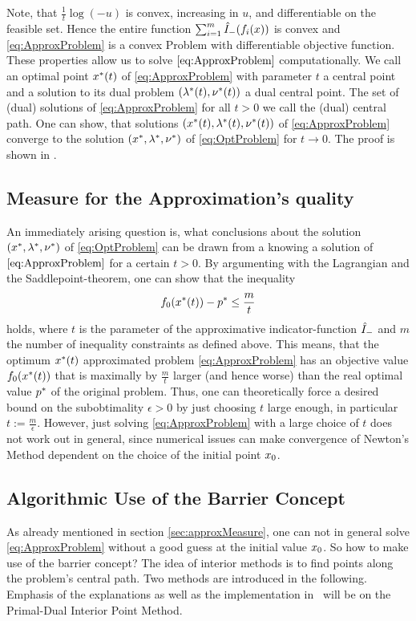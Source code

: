 Note, that $ \frac{1}{t}\log(-u) $ is convex, increasing in $ u $, and differentiable on the feasible set. Hence the entire function $ \sum_{i=1}^{m} {\hat{I}}_{\mathrm{-}}(f_i(x)) $ is convex and \eqref{eq:ApproxProblem} is a convex Problem with differentiable objective function. These properties allow us to solve $ \eqref{eq:ApproxProblem} $ computationally.
We call an optimal point $ x^*(t) $ of \eqref{eq:ApproxProblem} with parameter $ t $  a central point and a solution to its dual problem $ (\lambda^*(t),\nu^*(t)) $ a dual central point. The set of (dual) solutions of \eqref{eq:ApproxProblem} for all $ t>0 $ we call the (dual) central path.
One can show, that solutions $ (x^*(t),\lambda^*(t),\nu^*(t)) $ of \eqref{eq:ApproxProblem} converge to the solution  $ (x^*,\lambda^*, \nu^*) $ of \eqref{eq:OptProblem} for $ t  \longrightarrow 0 $. The proof is shown in \cite{BV}.
\label{sec:BarrierConcept}
\subsection{Measure for the Approximation's quality}
An immediately arising question is, what conclusions about the solution $ (x^*,\lambda^*, \nu^*) $ of \eqref{eq:OptProblem} can be drawn from a knowing a solution of $ \eqref{eq:ApproxProblem} $ for a certain $ t>0 $. 
By \todo
argumenting with the Lagrangian and the Saddlepoint-theorem, one can show that the inequality
\[ f_0 (x^*(t)) - p^* \leq \frac{m}{t}\] holds, where $ t $ is the parameter of the approximative indicator-function $ {\hat{I}}_{\mathrm{-}} $ and $ m $ the number of inequality constraints as defined above. This means, that the optimum $ x^*(t) $ approximated problem \eqref{eq:ApproxProblem} has an objective value $ f_0(x^*(t)) $ that is maximally by $ \frac{m}{t} $ larger (and hence worse) than the real optimal value $ p^* $ of the original problem. Thus, one can theoretically force a desired bound on the subobtimality $ \epsilon >0 $ by just choosing $ t $ large enough, in particular $ t := \frac{m}{\epsilon} $. However, just solving \eqref{eq:ApproxProblem} with a large choice of $ t $ does not work out in general, since numerical issues can make convergence of Newton's Method dependent on the choice of the initial point $ x_0 $.
\label{sec:approxMeasure}

\subsection{Algorithmic Use of the Barrier Concept}
As already mentioned in section \ref{sec:approxMeasure}, one can not in general solve  \eqref{eq:ApproxProblem} without a good guess at the initial value $ x_0 $. So how to make use of the barrier concept? The idea of interior methods is to find points along the problem's central path. Two methods are introduced in the following. Emphasis of the explanations as well as the implementation in \matlab \ will be on the Primal-Dual Interior Point Method.
